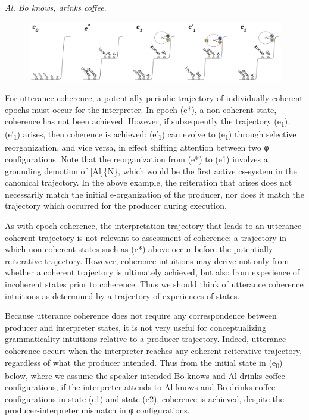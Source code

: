 \textit{Al, Bo knows, drinks coffee}.

  
\begin{figure}
\includegraphics[width=\textwidth]{figures/Tilsen-img125.png}
\caption{\missingcaption}
\label{fig:}
\end{figure}
 

  For utterance coherence, a potentially periodic trajectory of individually coherent epochs must occur for the interpreter. In epoch (e*), a non-coherent state, coherence has not been achieved. However, if subsequently the trajectory (e\textsubscript{1}), (e′\textsubscript{1}) arises, then coherence is achieved: (e′\textsubscript{1}) can evolve to (e\textsubscript{1}) through selective reorganization, and vice versa, in effect shifting attention between two φ configurations. Note that the reorganization from (e*) to (e1) involves a grounding demotion of [Al]\{N\}, which would be the first active cs-system in the canonical trajectory. In the above example, the reiteration that arises does not necessarily match the initial e-organization of the producer, nor does it match the trajectory which occurred for the producer during execution.

  As with epoch coherence, the interpretation trajectory that leads to an utterance-coherent trajectory is not relevant to assessment of coherence: a trajectory in which non-coherent states such as (e*) above occur before the potentially reiterative trajectory. However, coherence intuitions may derive not only from whether a coherent trajectory is ultimately achieved, but also from experience of incoherent states prior to coherence. Thus we should think of utterance coherence intuitions as determined by a trajectory of experiences of states.

  Because utterance coherence does not require any correspondence between producer and interpreter states, it is not very useful for conceptualizing grammaticality intuitions relative to a producer trajectory. Indeed, utterance coherence occurs when the interpreter reaches any coherent reiterative trajectory, regardless of what the producer intended. Thus from the initial state in (e\textsubscript{0}) below, where we assume the speaker intended {\textbar}Bo knows{\textbar} and {\textbar}Al drinks coffee{\textbar} configurations, if the interpreter attends to {\textbar}Al knows{\textbar} and {\textbar}Bo drinks coffee{\textbar} configurations in state (e1) and state (e2), coherence is achieved, despite the producer-interpreter mismatch in φ configurations.

